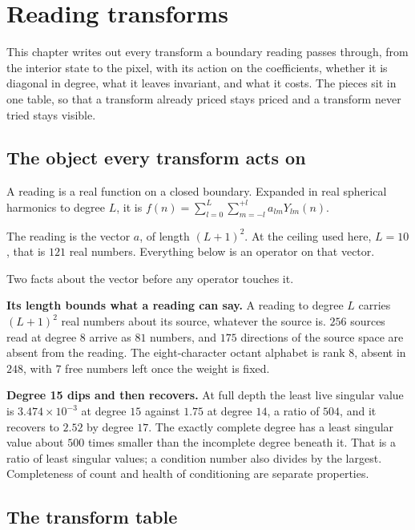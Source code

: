 \chapter{Reading transforms}

This chapter writes out every transform a boundary reading passes through, from the interior state to the pixel, with its action on the coefficients, whether it is diagonal in degree, what it leaves invariant, and what it costs. The pieces sit in one table, so that a transform already priced stays priced and a transform never tried stays visible.

\section{The object every transform acts on}

A reading is a real function on a closed boundary. Expanded in real spherical harmonics to degree \(L\), it is \(f(n) = \sum_{l=0}^{L} \sum_{m=-l}^{+l} a_{lm} Y_{lm}(n)\).

The reading is the vector \(a\), of length \((L+1)^2\). At the ceiling used here, \(L = 10\), that is \(121\) real numbers. Everything below is an operator on that vector.

Two facts about the vector before any operator touches it.

\textbf{Its length bounds what a reading can say.} A reading to degree \(L\) carries \((L+1)^2\) real numbers about its source, whatever the source is. \(256\) sources read at degree \(8\) arrive as \(81\) numbers, and \(175\) directions of the source space are absent from the reading. The eight-character octant alphabet is rank \(8\), absent in \(248\), with \(7\) free numbers left once the weight is fixed.

\textbf{Degree 15 dips and then recovers.} At full depth the least live singular value is \(3.474 \times 10^{-3}\) at degree \(15\) against \(1.75\) at degree \(14\), a ratio of \(504\), and it recovers to \(2.52\) by degree \(17\). The exactly complete degree has a least singular value about \(500\) times smaller than the incomplete degree beneath it. That is a ratio of least singular values; a condition number also divides by the largest. Completeness of count and health of conditioning are separate properties.

\section{The transform table}

